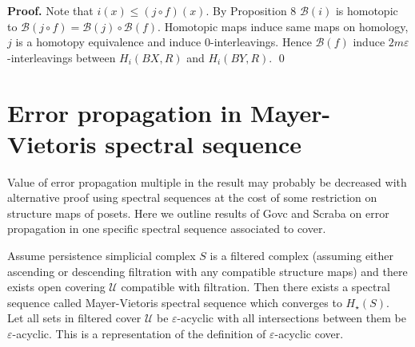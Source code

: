 \documentclass[a4paper, 12pt]{article}
\newtheorem{proposition}{Proposition}
\theoremstyle{definition}
\theoremstyle{remark}
\newenvironment{pf}{\noindent\textbf{Proof.}}{\qed}
\begin{document}
\begin{pf}
  Note that $i(x) \leqslant (j \circ f)(x)$. By Proposition 8 $\mathcal{B}(i)$ is homotopic to $\mathcal{B}(j \circ f) = \mathcal{B}(j) \circ \mathcal{B}(f)$. Homotopic maps induce same maps on homology, $j$ is a homotopy equivalence and induce $0$-interleavings. Hence $\mathcal{B}(f)$ induce $2m\varepsilon$-interleavings between $H_i(BX,R)$ and $H_i(BY,R)$.
\end{pf}

%
%
%

\section{Error propagation in Mayer-Vietoris spectral sequence}

Value of error propagation multiple in the result may probably be decreased with alternative proof using spectral sequences at the cost of some restriction on structure maps of posets. Here we outline results of Govc and Scraba on error propagation in one specific spectral sequence associated to cover.

Assume persistence simplicial complex $S$ is a filtered complex (assuming either ascending or descending filtration with any compatible structure maps) and there exists open covering $\mathcal{U}$ compatible with filtration. Then there exists a spectral sequence called Mayer-Vietoris spectral sequence which converges to $H_{\star}(S)$. {\cite[Theorem 2.30]{GS16}}\\

Let all sets in filtered cover $\mathcal{U}$ be $\varepsilon$-acyclic with all intersections between them be $\varepsilon$-acyclic. This is a representation of the definition of $\varepsilon$-acyclic cover. {\cite[Definition 3.2]{GS16}}\\
\end{document}
